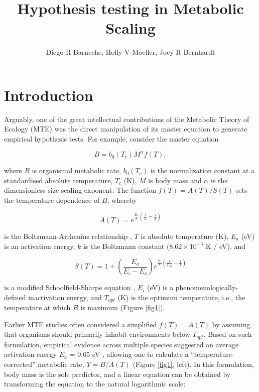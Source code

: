 \documentclass[a4paper,12pt]{article}
\title{Hypothesis testing in Metabolic Scaling}
\author{Diego R Barneche, Holly V Moeller, Joey R Bernhardt}
\begin{document}
\maketitle

\section{Introduction}

Arguably, one of the great intellectual contributions of the Metabolic Theory of Ecology (MTE) was the direct manipulation of its master equation to generate empirical hypothesis tests. For example, consider the master equation

\begin{equation}
  B = b_0(T_c) M^\alpha f(T),
  \label{eq1}
\end{equation}

where $B$ is organismal metabolic rate, $b_0(T_c)$ is the normalization constant at a standardised absolute temperature, $T_c$ (K), $M$ is body mass and $\alpha$ is the dimensionless size scaling exponent. The function $f(T) = A(T)/S(T)$ sets the temperature dependence of $B$, whereby 

\begin{equation}
    A(T) = e^{\frac{E_a}{k}\left(\frac{1}{T_c} - \frac{1}{T}\right)}
    \label{eqAB}
\end{equation} 

is the Boltzmann-Arrhenius relationship \cite{gillooly2001science}, $T$ is absolute temperature (K), $E_a$ (eV) is an activation energy, $k$ is the Boltzmann constant ($8.62 \times 10^{-5}$ K / eV), and

\begin{equation}
    S(T) = 1 + \left(\frac{E_a}{E_i - E_a}\right) e^{\frac{E_i}{k}\left(\frac{1}{T_{opt}} - \frac{1}{T}\right)}
    \label{eqSS}
\end{equation} 

is a modified Schoolfield-Sharpe equation \cite{schoolfield1981, barneche2014ele}, $E_i$ (eV) is a phenomenologically-defined inactivation energy, and $T_{opt}$ (K) is the optimum temperature, i.e., the temperature at which $B$ is maximum (Figure \ref{fig1}).

Earlier MTE studies often considered a simplified $f(T) = A(T)$ by assuming that organisms should primarily inhabit environments below $T_{opt}$. Based on such formulation, empirical evidence across multiple species suggested an average activation energy $E_a$ = 0.65 eV \cite{gillooly2001science, brown2004ecology}, allowing one to calculate a ``temperature-corrected'' metabolic rate, $Y = B / A(T)$ (Figure \ref{fig1}, left). In this formulation, body mass is the sole predictor, and a linear equation can be obtained by transforming the equation to the natural logarithmic scale:
\end{document}
